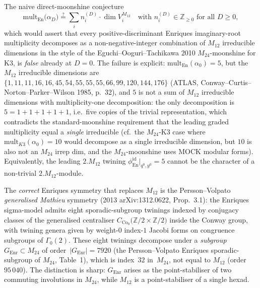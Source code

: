 \begin{theorem}
\label{thm:bkm-enriques-m12-falsification}
The naive direct-moonshine conjecture
\[
 \mathrm{mult}_{\mathrm{En}}\bigl(\alpha_D\bigr)
 \stackrel{?}{=}
 \sum_{i} n_i^{(D)}\cdot\dim V_i^{M_{12}}
 \quad\text{with } n_i^{(D)}\in\mathbb{Z}_{\geq 0}
 \text{ for all } D \geq 0,
\]
which would assert that every positive-discriminant Enriques
imaginary-root multiplicity decomposes as a non-negative-integer
combination of $M_{12}$ irreducible dimensions in the style of
the Eguchi--Ooguri--Tachikawa 2010 $M_{24}$-moonshine for K3,
is \emph{false} already at $D = 0$. The failure is explicit:
$\mathrm{mult}_{\mathrm{En}}(\alpha_0) = 5$, but the $M_{12}$
irreducible dimensions are
$\{1, 11, 11, 16, 16, 45, 54, 55, 55, 55, 66, 99, 120, 144, 176\}$
(ATLAS, Conway--Curtis--Norton--Parker--Wilson 1985, p.~32),
and $5$ is not a sum of $M_{12}$ irreducible dimensions with
multiplicity-one decomposition: the only decomposition is
$5 = 1 + 1 + 1 + 1 + 1$, i.e.\ five copies of the trivial
representation, which contradicts the standard-moonshine
requirement that the leading graded multiplicity equal a
\emph{single} irreducible (cf.\ the $M_{24}$-K3 case where
$\mathrm{mult}_{K3}(\alpha_0) = 10$ would decompose as a single
irreducible dimension, but $10$ is also not an $M_{24}$ irrep
dim, and the $M_{24}$-moonshine uses MOCK modular forms).
Equivalently, the leading $2.M_{12}$ twining
$\phi^{\mathrm{id}}_{\mathrm{En}}|_{q^0, y^0} = 5$ cannot be the
character of a non-trivial $2.M_{12}$-module.

The \emph{correct} Enriques symmetry that replaces $M_{12}$
is the Persson--Volpato \emph{generalised Mathieu} symmetry
(2013 arXiv:1312.0622, Prop.~3.1): the Enriques sigma-model
admits eight sporadic-subgroup twinings indexed by conjugacy
classes of the generalised centraliser
$C_{\mathrm{Co}_0}\bigl(\mathbb{Z}/2\times\mathbb{Z}/2\bigr)$
inside the Conway group, with twining genera given by weight-$0$
index-$1$ Jacobi forms on congruence subgroups of $\Gamma_0(2)$.
These eight twinings decompose under a \emph{subgroup}
$G_{\mathrm{Enr}}\subset M_{24}$ of order~$|G_{\mathrm{Enr}}| = 7920$
(the Persson--Volpato Enriques sporadic-subgroup of $M_{24}$,
Table~1), which is index~$32$ in~$M_{24}$, not equal to
$M_{12}$ (order~$95\,040$). The distinction is sharp:
$G_{\mathrm{Enr}}$ arises as the point-stabiliser of two commuting
involutions in $M_{24}$, while $M_{12}$ is a point-stabiliser of
a single hexad.


\end{theorem}
